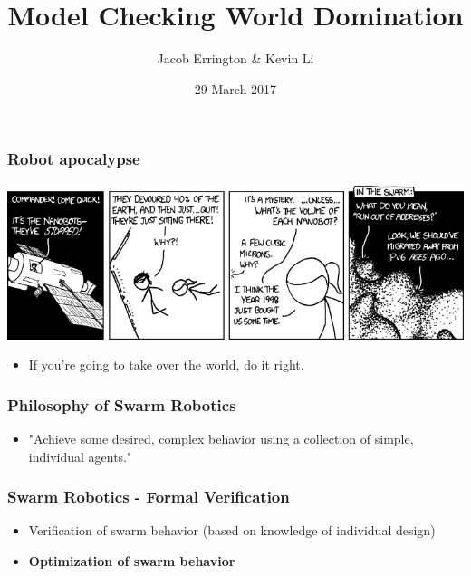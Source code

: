 \documentclass{beamer}
\title{Model Checking World Domination}
\author{Jacob Errington \& Kevin Li}
\institute{McGill University}
\date{29 March 2017}
\theoremstyle{definition}
\begin{document}
\frame{\titlepage}

\begin{frame}
    \frametitle{Robot apocalypse}

    \includegraphics[width=\textwidth]{nanobots.png}

    \pause

    \begin{itemize}
        \item
            If you're going to take over the world, \alert{do it right.}
    \end{itemize}
\end{frame}

\begin{frame}
    \frametitle{Philosophy of Swarm Robotics}
    \begin{itemize}
        \item
    "Achieve some desired, complex behavior using a collection of simple, individual agents."
    \end{itemize}
\end{frame}

\begin{frame}
    \frametitle{Swarm Robotics - Formal Verification}

    \begin{itemize}
        \item Verification of swarm behavior (based on knowledge of individual design)
        \item \textbf{Optimization of swarm behavior}
    \end{itemize}
\end{frame}
\end{document}
